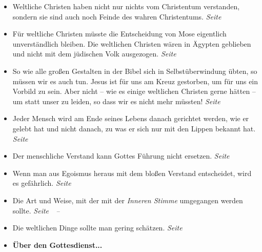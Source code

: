 \begin{itemize}
 \item Weltliche Christen haben nicht nur nichts vom Christentum verstanden,
sondern sie sind auch noch Feinde des wahren Christentums.
 \dotfill \textit{Seite~\pageref{ref:04_13_weltliche_christen}}\\

 \item Für weltliche Christen müsste die Entscheidung von Mose eigentlich
unverständlich bleiben. Die weltlichen Christen wären in Ägypten geblieben und
nicht mit dem jüdischen Volk ausgezogen.
 \dotfill \textit{Seite~\pageref{ref:04_17_mose}}\\

 \item So wie alle großen Gestalten in der Bibel sich in Selbstüberwindung
übten, so müssen wir es auch tun. Jesus ist für uns am Kreuz gestorben, um für uns
ein Vorbild zu sein. Aber nicht -- wie es einige weltlichen Christen gerne
hätten -- um statt unser zu leiden, so dass wir es nicht mehr müssten!
 \dotfill \textit{Seite~\pageref{ref:04_20_opfertod}}\\

 \item Jeder Mensch wird am Ende seines Lebens danach gerichtet werden, wie er
gelebt hat und nicht danach, zu was er sich nur mit den Lippen bekannt hat.
 \dotfill \textit{Seite~\pageref{ref:04_21_gericht}}\\

 \item Der menschliche Verstand kann Gottes Führung nicht ersetzen.
 \dotfill \textit{Seite~\pageref{ref:04_22_vernunft}}\\

 \item Wenn man aus Egoismus heraus mit dem bloßen Verstand entscheidet, wird
es gefährlich.
 \dotfill \textit{Seite~\pageref{ref:04_22_vernunft_und_ego}}\\

 \item Die Art und Weise, mit der mit der \textit{Inneren Stimme} umgegangen werden
sollte.
 \dotfill
 \textit{Seite~\pageref{ref:04_23_innere_stimme}~--~\pageref{ref:04_23_innere_stimme_ende}}\\

 \item Die weltlichen Dinge sollte man gering schätzen.
 \dotfill \textit{Seite~\pageref{ref:04_23_dinge_der_welt}}\\

 \item \textbf{Über den Gottesdienst...}


\end{itemize}
